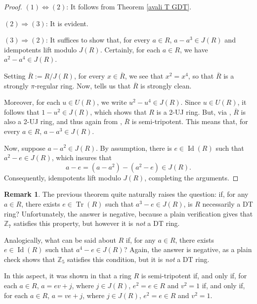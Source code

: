 \documentclass[12pt]{amsart}
\theoremstyle{definition}
\newtheorem{remark}[theorem]{Remark}
\begin{document}
\begin{proof}
$(1) \Leftrightarrow (2)$: It follows from Theorem \ref{avali T GDT}.

$(2) \Rightarrow  (3)$: It is evident.

$(3) \Rightarrow  (2)$: It suffices to show that, for every $a \in R$, $a - a^3 \in J(R)$ and idempotents lift modulo $J(R)$. Certainly, for each $a \in R$, we have $a^2 - a^4 \in J(R)$.

Setting $\overline{R} := R/J(R)$, for every $x \in \overline{R}$, we see that $x^2 = x^4$, so that $\overline{R}$ is a strongly $\pi$-regular ring. Now, \cite[Theorem 1]{nstr} tells us that $\overline{R}$ is strongly clean.

Moreover, for each $u \in U(R)$, we write $u^2 - u^4 \in J(R)$. Since $u \in U(R)$, it follows that $1 - u^2 \in J(R)$, which shows that $R$ is a 2-UJ ring. But, via \cite[Lemma 2.5]{cui}, $\overline{R}$ is also a 2-UJ ring, and thus again from \cite[Theorem 3.3]{cui}, $\overline{R}$ is semi-tripotent. This means that, for every $a \in R$, $a - a^3 \in J(R)$.

Now, suppose $a - a^2 \in J(R)$. By assumption, there is $e \in \operatorname{Id}(R)$ such that $a^2 - e \in J(R)$, which insures that
\[
a - e = (a - a^2) - (a^2 - e) \in J(R).
\]
Consequently, idempotents lift modulo $J(R)$, completing the arguments.
\end{proof}

\begin{remark}
The previous theorem quite naturally raises the question: if, for any $a \in R$, there exists $e \in \operatorname{Tr}(R)$ such that $a^3 - e \in J(R)$, is $R$ necessarily a DT ring? Unfortunately, the answer is negative, because a plain verification gives that $\mathbb{Z}_7$ satisfies this property, but however it is {\it not} a DT ring.

Analogically, what can be said about $R$ if, for any $a \in R$, there exists $e \in \operatorname{Id}(R)$ such that $a^4 - e \in J(R)$? Again, the answer is negative, as a plain check shows that $\mathbb{Z}_5$ satisfies this condition, but it is {\it not} a DT ring.
\end{remark}

In this aspect, it was shown in \cite[Theorem 3.5]{kyzr} that a ring $R$ is semi-tripotent if, and only if, for each $a \in R$, $a = ev + j$, where $j \in J(R)$, $e^2 = e \in R$ and $v^2 = 1$ if, and only if, for each $a \in R$, $a = ve + j$, where $j \in J(R)$, $e^2 = e \in R$ and $v^2 = 1$.
\end{document}
